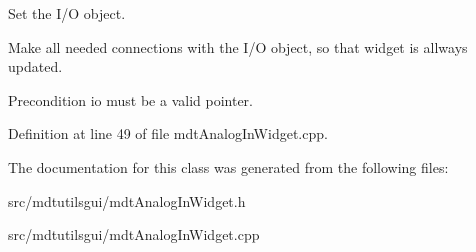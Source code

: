 Set the I/O object. 

Make all needed connections with the I/O object, so that widget is allways updated.

\begin{DoxyPrecond}{Precondition}
io must be a valid pointer. 
\end{DoxyPrecond}


Definition at line 49 of file mdtAnalogInWidget.cpp.



The documentation for this class was generated from the following files:\begin{DoxyCompactItemize}
\item 
src/mdtutilsgui/mdtAnalogInWidget.h\item 
src/mdtutilsgui/mdtAnalogInWidget.cpp\end{DoxyCompactItemize}
